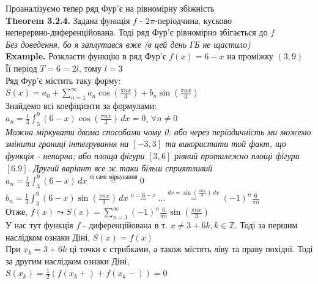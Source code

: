 \documentclass[a4paper, 14pt]{extarticle}
\def\hugespace{\vspace{5mm} \\}
\begin{document}
Проаналізуємо тепер ряд Фур'є на рівномірну збіжність\\
\textbf{Theorem 3.2.4.} Задана функція $f$ - $2\pi$-періодчина, кусково \\ неперервно-диференційована. Тоді ряд Фур'є рівномірно збігається до $f$\\
\textit{Без доведення, бо я заплутався вже (в цей день ГБ не щастило)}
\hugespace
\textbf{Example.} Розкласти функцію в ряд Фур'є $f(x) = 6-x$ на проміжку $(3, 9)$\\
Її період $T = 6 = 2l$, тому $l=3$\\
Ряд Фур'є містить таку форму:\\
$\displaystyle S(x) = a_0 + \sum_{n=1}^{\infty} a_n \cos \left(\frac{\pi n x}{3} \right) + b_n \sin \left(\frac{\pi n x}{3} \right)$\\
Знайдемо всі коефіцієнти за формулами:\\
$\displaystyle a_n = \frac{1}{3} \int_{3}^{9} (6-x) \cos \left(\frac{\pi n x}{3} \right) \,dx = 0$, $\forall n \neq 0$\\
\textit{Можна міркувати двома способами чому 0: або через періодичність ми можемо змінити границі інтегрування на $[-3,3]$ та використати той факт, що функція - непарна; або площа фігури $[3,6]$ рівний протилежно площі фігури $[6.9]$. Другий варіант все ж таки більш сприятливий}\\
$\displaystyle a_n = \frac{1}{3} \int_{3}^{9} (6-x) \,dx \overset{\textrm{ті самі міркування}}{=} 0$\\
$\displaystyle b_n = \frac{1}{3} \int_{3}^{9} (6-x) \sin \left(\frac{\pi n x}{3} \right) \,dx \overset{u = 6-x}{=} \dots \overset{dv = \sin \left(\frac{\pi n x}{3} \right) \,dx}{=} (-1)^n \frac{6}{\pi n}$\\
Отже, $\displaystyle f(x) \leadsto S(x) = \sum_{n=1}^{\infty} (-1)^n\frac{6}{\pi n} \sin \left(\frac{\pi n x}{3} \right)$\\
У нас тут функція $f$ - диференційована в т. $x \neq 3 + 6k, k \in \mathbb{Z}$. Тоді за першим наслідком ознаки Діні, $S(x) = f(x)$\\
При $x_k = 3 + 6k$ ці точки є стрибками, а також містять ліву та праву похідні. Тоді за другим наслідком ознаки Діні, \\ $S(x_k) = \displaystyle \frac{1}{2} (f(x_k+) + f(x_k-)) = 0$
\end{document}
